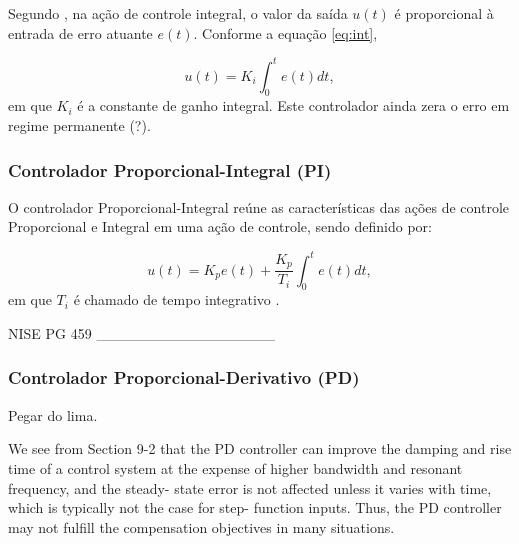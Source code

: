 Segundo , na ação de controle integral, o valor da saída $u(t)$ é proporcional à entrada de erro atuante $e(t)$. 
Conforme a equação \ref{eq:int}, 

\begin{equation}
 u(t) = K_i \int_{0}^{t}e(t)dt,
\end{equation}
em que $K_i$ é a constante de ganho integral. Este controlador ainda zera o erro em regime permanente (?).



\subsubsection{Controlador Proporcional-Integral (PI)}

O controlador Proporcional-Integral reúne as características das ações de controle Proporcional e Integral em uma ação de controle, 
sendo definido por:

\begin{equation}
 u(t) = K_pe(t) + \frac{K_p}{T_i}\int_{0}^{t}e(t)dt,
\end{equation}
em que $T_i$ é chamado de tempo integrativo \cite{ogata}.

NISE PG 459
_________________






\subsubsection{Controlador Proporcional-Derivativo (PD)}

Pegar do lima.


We see from Section 9-2 that the PD controller can improve the damping and rise time of a
control system at the expense of higher bandwidth and resonant frequency, and the steady-
state error is not affected unless it varies with time, which is typically not the case for step-
function inputs. Thus, the PD controller may not fulfill the compensation objectives in
many situations.


